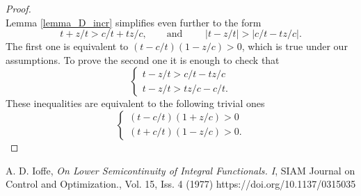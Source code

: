 \documentclass{amsart}
\theoremstyle{remark}
\numberwithin{equation}{section}
\numberwithin{figure}{section}
\begin{document}
\begin{proof}
\[	\]
	Lemma \ref{lemma_D_incr} simplifies even further to the form
	\[
	t + z/t > c/t + tz/c, \qquad \mbox{and } \qquad |t - z/t| > |c/t - tz/c|.
	\]
	The first one is equivalent to $(t - c/t)(1 - z/c) > 0$, which is true under our assumptions.
	To prove the second one it is enough to check that
	\[
	\begin{cases}
		t - z/t > c/t - tz/c \\
		t - z/t > tz/c - c/t.
	\end{cases}
	\]
	These inequalities are equivalent to the following trivial ones
	\[
	\begin{cases}
		(t - c/t)(1 + z/c) > 0 \\
		(t + c/t)(1 - z/c) > 0.
	\end{cases}
	\]	
\end{proof}	



\begin{thebibliography}{99}
	
	{\baselineskip=10pt \small
		
		 A. D. Ioffe, {\it On Lower Semicontinuity of Integral Functionals. I},
		{\sc SIAM Journal on Control and Optimization.}, Vol. 15, Iss. 4 (1977) https://doi.org/10.1137/0315035
		
	} %
	
\end{thebibliography}
\end{document}
